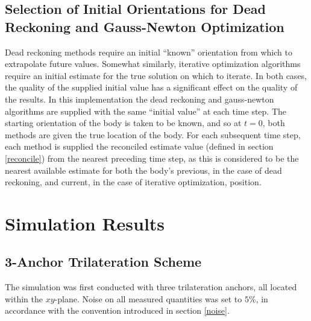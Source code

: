 \documentclass{report}
\begin{document}
\newpage
			
		\section{Selection of Initial Orientations for Dead Reckoning and Gauss-Newton Optimization}
			Dead reckoning methods require an initial ``known'' orientation from which to extrapolate future values. Somewhat similarly, iterative optimization algorithms require an initial estimate for the true solution on which to iterate. In both cases, the quality of the supplied initial value has a significant effect on the quality of the results. In this implementation the dead reckoning and gauss-newton algorithms are supplied with the same ``initial value'' at each time step. The starting orientation of the body is taken to be known, and so at $t=0$, both methods are given the true location of the body. For each subsequent time step, each method is supplied the reconciled estimate value (defined in section \ref{reconcile}) from the nearest preceding time step, as this is considered to be the nearest available estimate for both the body's previous, in the case of dead reckoning, and current, in the case of iterative optimization, position.
			
	\chapter{Simulation Results}
		\section{3-Anchor Trilateration Scheme}
			The simulation was first conducted with three trilateration anchors, all located within the $xy$-plane. Noise on all measured quantities was set to $5\%$, in accordance with the convention introduced in section \ref{noise}.
\end{document}
